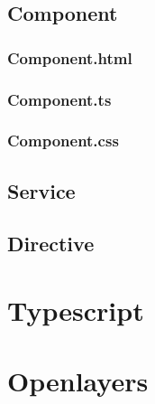 \subsection{Component}
\label{sec:technologies:angular:component}

\subsubsection{Component.html}
\label{sec:technologies:angular:component:html}

\subsubsection{Component.ts}
\label{sec:technologies:angular:component:ts}

\subsubsection{Component.css}
\label{sec:technologies:angular:css}

\subsection{Service}
\label{sec:technologies:angular:service}

\subsection{Directive}
\label{sec:technologies:angular:directive}


\section{Typescript}
\label{sec:technologies:ts}

\section{Openlayers}
\label{sec:technologies:ol}

